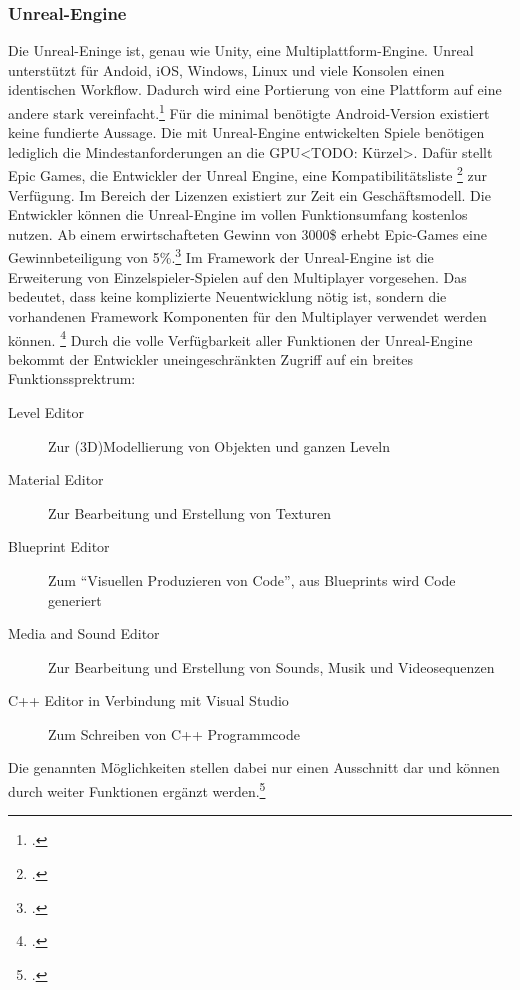 	\subsubsection*{Unreal-Engine}
	Die Unreal-Eninge ist, genau wie Unity, eine Multiplattform-Engine. Unreal unterstützt für Andoid, iOS, Windows, Linux und viele Konsolen einen identischen Workflow. Dadurch wird eine Portierung von eine Plattform auf eine andere stark vereinfacht.\footcite[\url{https://www.unrealengine.com/what-is-unreal-engine-4}]{unreal-home} Für die minimal benötigte Android-Version existiert keine fundierte Aussage. Die mit Unreal-Engine entwickelten Spiele benötigen lediglich die Mindestanforderungen an die GPU<TODO: Kürzel>. Dafür stellt Epic Games, die Entwickler der Unreal Engine, eine Kompatibilitätsliste \footcite[\url{https://docs.unrealengine.com/latest/INT/Platforms/Android/DeviceCompatibility/index.html}]{unreal-home} zur Verfügung. Im Bereich der Lizenzen existiert zur Zeit ein Geschäftsmodell. Die Entwickler können die Unreal-Engine im vollen Funktionsumfang kostenlos nutzen. Ab einem erwirtschafteten Gewinn von 3000\$ erhebt Epic-Games eine Gewinnbeteiligung von 5\%.\footcite[\url{https://www.unrealengine.com/custom-licensing}]{unreal-home} Im Framework der Unreal-Engine ist die Erweiterung von Einzelspieler-Spielen auf den Multiplayer vorgesehen. Das bedeutet, dass keine komplizierte Neuentwicklung nötig ist, sondern die vorhandenen Framework Komponenten für den Multiplayer verwendet werden können. \footcite[\url{https://docs.unrealengine.com/latest/INT/Gameplay/Networking/Overview/index.html}]{unreal-home} Durch die volle Verfügbarkeit aller Funktionen der Unreal-Engine bekommt der Entwickler uneingeschränkten Zugriff auf ein breites Funktionssprektrum:
	\begin{description}
		\item[Level Editor]{Zur (3D)Modellierung von Objekten und ganzen Leveln}
		\item[Material Editor]{Zur Bearbeitung und Erstellung von Texturen}
		\item[Blueprint Editor]{Zum \enquote{Visuellen Produzieren von Code}, aus Blueprints wird Code generiert}
		\item[Media and Sound Editor]{Zur Bearbeitung und Erstellung von Sounds, Musik und Videosequenzen}
		\item[C++ Editor in Verbindung mit Visual Studio]{Zum Schreiben von C++ Programmcode}
	\end{description}
	Die genannten Möglichkeiten stellen dabei nur einen Ausschnitt dar und können durch weiter Funktionen ergänzt werden.\footcite[https://docs.unrealengine.com/latest/INT/GettingStarted/SubEditors/]{unreal-home}

